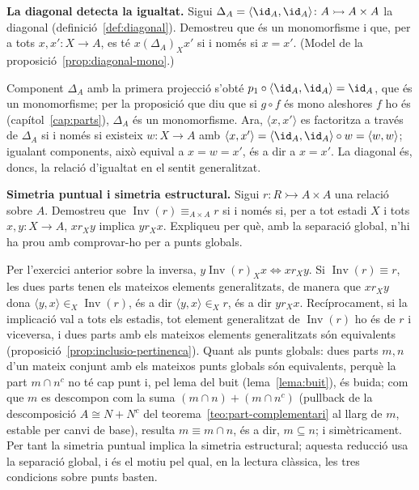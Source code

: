 \begin{exercici}
\textbf{La diagonal detecta la igualtat.} Sigui \(\Delta_A=\langle\id_A,\id_A\rangle\colon A\rightarrowtail A\times A\) la diagonal (definició~\ref{def:diagonal}). Demostreu que és un monomorfisme i que, per a tots \(x,x'\colon X\to A\), es té \(x\mathrel{(\Delta_A)_X}x'\) si i només si \(x=x'\). (Model de la proposició~\ref{prop:diagonal-mono}.)
\end{exercici}
\begin{solucio}
Component \(\Delta_A\) amb la primera projecció s'obté \(p_1\circ\langle\id_A,\id_A\rangle=\id_A\), que és un monomorfisme; per la proposició que diu que si \(g\circ f\) és mono aleshores \(f\) ho és (capítol~\ref{cap:parts}), \(\Delta_A\) és un monomorfisme. Ara, \(\langle x,x'\rangle\) es factoritza a través de \(\Delta_A\) si i només si existeix \(w\colon X\to A\) amb \(\langle x,x'\rangle=\langle\id_A,\id_A\rangle\circ w=\langle w,w\rangle\); igualant components, això equival a \(x=w=x'\), és a dir a \(x=x'\). La diagonal és, doncs, la relació d'igualtat en el sentit generalitzat.
\end{solucio}

\begin{exercici}
\textbf{Simetria puntual i simetria estructural.} Sigui \(r\colon R\rightarrowtail A\times A\) una relació sobre \(A\). Demostreu que \(\operatorname{Inv}(r)\equiv_{A\times A}r\) si i només si, per a tot estadi \(X\) i tots \(x,y\colon X\to A\), \(x\mathrel{r_X}y\) implica \(y\mathrel{r_X}x\). Expliqueu per què, amb la separació global, n'hi ha prou amb comprovar-ho per a punts globals.
\end{exercici}
\begin{solucio}
Per l'exercici anterior sobre la inversa, \(y\mathrel{\operatorname{Inv}(r)_X}x\iff x\mathrel{r_X}y\). Si \(\operatorname{Inv}(r)\equiv r\), les dues parts tenen els mateixos elements generalitzats, de manera que \(x\mathrel{r_X}y\) dona \(\langle y,x\rangle\in_X\operatorname{Inv}(r)\), és a dir \(\langle y,x\rangle\in_X r\), és a dir \(y\mathrel{r_X}x\). Recíprocament, si la implicació val a tots els estadis, tot element generalitzat de \(\operatorname{Inv}(r)\) ho és de \(r\) i viceversa, i dues parts amb els mateixos elements generalitzats són equivalents (proposició~\ref{prop:inclusio-pertinenca}). Quant als punts globals: dues parts \(m,n\) d'un mateix conjunt amb els mateixos punts globals són equivalents, perquè la part \(m\cap n^c\) no té cap punt i, pel lema del buit (lema~\ref{lema:buit}), és buida; com que \(m\) es descompon com la suma \((m\cap n)+(m\cap n^c)\) (pullback de la descomposició \(A\cong N+N^c\) del teorema~\ref{teo:part-complementari} al llarg de \(m\), estable per canvi de base), resulta \(m\equiv m\cap n\), és a dir, \(m\subseteq n\); i simètricament. Per tant la simetria puntual implica la simetria estructural; aquesta reducció usa la separació global, i és el motiu pel qual, en la lectura clàssica, les tres condicions sobre punts basten.
\end{solucio}

